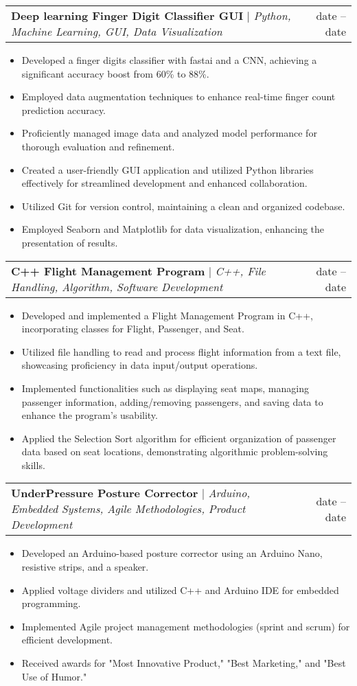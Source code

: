 \documentclass[A4,10pt]{article}
\makeatletter
\newcommand{\resumeItem}[1]{
  \item\small{
    {#1 \vspace{-2pt}}
  }
}
\newcommand{\resumeProjectHeading}[2]{
    \item
    \begin{tabular*}{0.97\textwidth}{l@{\extracolsep{\fill}}r}
      \small#1 & #2 \\
    \end{tabular*}\vspace{-7pt}
}
\newcommand{\resumeItemListStart}{\begin{itemize}}
\newcommand{\resumeItemListEnd}{\end{itemize}\vspace{-5pt}}
\makeatother
\begin{document}
        \resumeProjectHeading
        {\textbf{Deep learning Finger Digit Classifier GUI} $|$ \emph{Python, Machine Learning, GUI, Data Visualization}}{date -- date}
        \resumeItemListStart
          \resumeItem{Developed a finger digits classifier with fastai and a CNN, achieving a significant accuracy boost from 60\% to 88\%.}
          \resumeItem{Employed data augmentation techniques to enhance real-time finger count prediction accuracy.}
          \resumeItem{Proficiently managed image data and analyzed model performance for thorough evaluation and refinement.}
          \resumeItem{Created a user-friendly GUI application and utilized Python libraries effectively for streamlined development and enhanced collaboration.}
          \resumeItem{Utilized Git for version control, maintaining a clean and organized codebase.}
          \resumeItem{Employed Seaborn and Matplotlib for data visualization, enhancing the presentation of results.}
        \resumeItemListEnd
        \resumeProjectHeading
        {\textbf{C++ Flight Management Program} $|$ \emph{C++, File Handling, Algorithm, Software Development}}{date -- date}
        \resumeItemListStart
          \resumeItem{Developed and implemented a Flight Management Program in C++, incorporating classes for Flight, Passenger, and Seat.}
          \resumeItem{Utilized file handling to read and process flight information from a text file, showcasing proficiency in data input/output operations.}
          \resumeItem{Implemented functionalities such as displaying seat maps, managing passenger information, adding/removing passengers, and saving data to enhance the program's usability.}
          \resumeItem{Applied the Selection Sort algorithm for efficient organization of passenger data based on seat locations, demonstrating algorithmic problem-solving skills.}
        \resumeItemListEnd
  
        \resumeProjectHeading
        {\textbf{UnderPressure Posture Corrector} $|$ \emph{Arduino, Embedded Systems, Agile Methodologies, Product Development}}{date -- date}
        \resumeItemListStart
          \resumeItem{Developed an Arduino-based posture corrector using an Arduino Nano, resistive strips, and a speaker.}
          \resumeItem{Applied voltage dividers and utilized C++ and Arduino IDE for embedded programming.}
          \resumeItem{Implemented Agile project management methodologies (sprint and scrum) for efficient development.}
          \resumeItem{Received awards for "Most Innovative Product," "Best Marketing," and "Best Use of Humor."}
        \resumeItemListEnd
  
\end{document}
